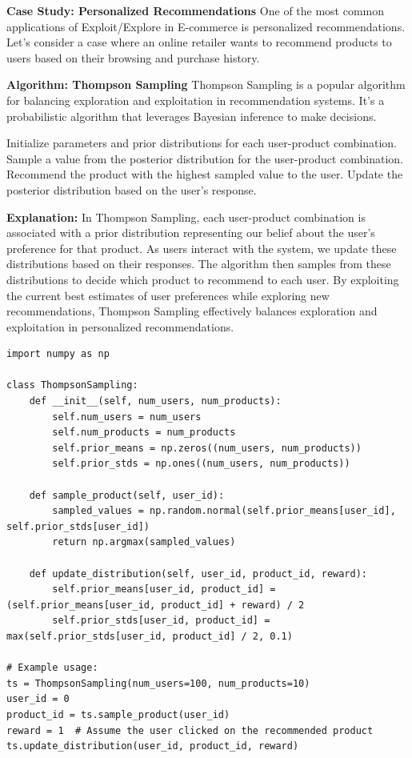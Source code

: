 \documentclass[12pt]{book} %
\begin{document}
\textbf{Case Study: Personalized Recommendations}
One of the most common applications of Exploit/Explore in E-commerce is personalized recommendations. Let's consider a case where an online retailer wants to recommend products to users based on their browsing and purchase history. 

\textbf{Algorithm: Thompson Sampling}
Thompson Sampling is a popular algorithm for balancing exploration and exploitation in recommendation systems. It's a probabilistic algorithm that leverages Bayesian inference to make decisions.
\FloatBarrier
\begin{algorithm}
\caption{Thompson Sampling for Personalized Recommendations}
\begin{algorithmic}[1]
\State Initialize parameters and prior distributions for each user-product combination.
        \State Sample a value from the posterior distribution for the user-product combination.
    \EndFor
    \State Recommend the product with the highest sampled value to the user.
    \State Update the posterior distribution based on the user's response.
\EndFor
\end{algorithmic}
\end{algorithm}
\FloatBarrier

\textbf{Explanation:}
In Thompson Sampling, each user-product combination is associated with a prior distribution representing our belief about the user's preference for that product. As users interact with the system, we update these distributions based on their responses. The algorithm then samples from these distributions to decide which product to recommend to each user. By exploiting the current best estimates of user preferences while exploring new recommendations, Thompson Sampling effectively balances exploration and exploitation in personalized recommendations.

\FloatBarrier
\begin{lstlisting}
import numpy as np

class ThompsonSampling:
    def __init__(self, num_users, num_products):
        self.num_users = num_users
        self.num_products = num_products
        self.prior_means = np.zeros((num_users, num_products))
        self.prior_stds = np.ones((num_users, num_products))
    
    def sample_product(self, user_id):
        sampled_values = np.random.normal(self.prior_means[user_id], self.prior_stds[user_id])
        return np.argmax(sampled_values)
    
    def update_distribution(self, user_id, product_id, reward):
        self.prior_means[user_id, product_id] = (self.prior_means[user_id, product_id] + reward) / 2
        self.prior_stds[user_id, product_id] = max(self.prior_stds[user_id, product_id] / 2, 0.1)

# Example usage:
ts = ThompsonSampling(num_users=100, num_products=10)
user_id = 0
product_id = ts.sample_product(user_id)
reward = 1  # Assume the user clicked on the recommended product
ts.update_distribution(user_id, product_id, reward)
\end{lstlisting}
\end{document}
